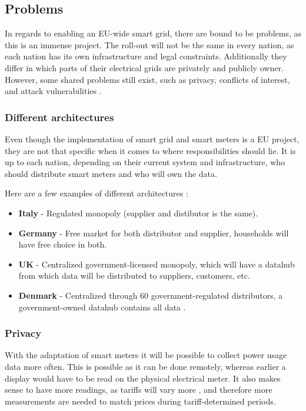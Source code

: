 \subsection{Problems}
In regards to enabling an EU-wide smart grid, there are bound to be problems, as this is an immense project.
The roll-out will not be the same in every nation, as each nation has its own infrastructure and legal constraints.
Additionally they differ in which parts of their electrical grids are privately and publicly owner.
However, some shared problems still exist, such as privacy, conflicts of interest, and attack vulnerabilities \cite{offswitch, smart_meter_survey, security_economics}.

\subsubsection{Different architectures}
Even though the implementation of smart grid and smart meters is a EU project, they are not that specific when it comes to where responsibilities should lie.
It is up to each nation, depending on their current system and infrastructure, who should distribute smart meters and who will own the data.

Here are a few examples of different architectures \cite{smart_meter_survey}:
\begin{itemize}
	\item \textbf{Italy} - Regulated monopoly (supplier and distibutor is the same).
	\item \textbf{Germany} - Free market for both distributor and supplier, households will have free choice in both.
	\item \textbf{UK} - Centralized government-licensed monopoly, which will have a datahub from which data will be distributed to suppliers, customers, etc.
	\item \textbf{Denmark} - Centralized through 60 government-regulated distributors, a government-owned datahub contains all data \cite{dk_marked,LOV_nr_575_af_18-06-2012}.
\end{itemize}

\subsubsection{Privacy}
With the adaptation of smart meters it will be possible to collect power usage data more often.
This is possible as it can be done remotely, whereas earlier a display would have to be read on the physical electrical meter.
It also makes sense to have more readings, as tariffs will vary more \cite{directive_2009_72_EC, eu_smart_meter_pricing}, and therefore more measurements are needed to match prices during tariff-determined periods.

